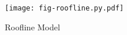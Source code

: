 \begin{figure}[h]

  \centering
  \texttt{[image: fig-roofline.py.pdf]}

  \caption{Roofline Model}

  \label{fig-roofline}

\end{figure}